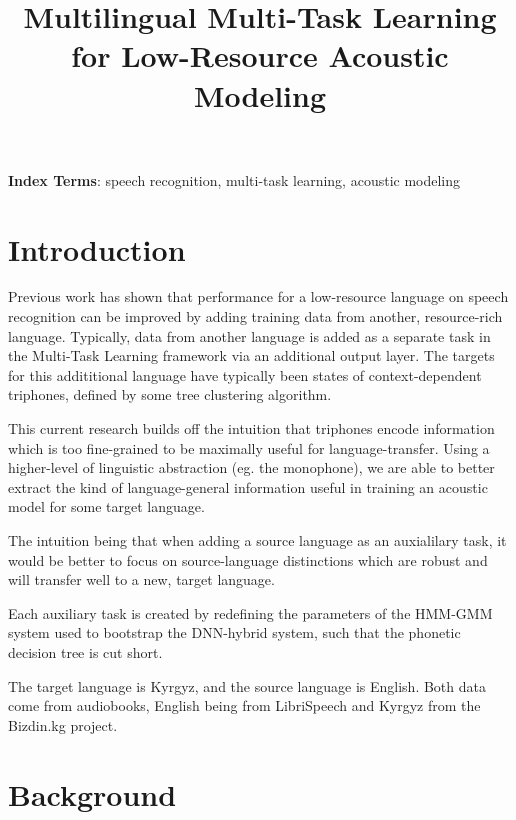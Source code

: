 \documentclass[a4paper]{article}
\title{Multilingual Multi-Task Learning for Low-Resource Acoustic Modeling}
\begin{document}
\maketitle
% 
\begin{abstract}
  
\end{abstract}
\noindent\textbf{Index Terms}: speech recognition, multi-task learning, acoustic modeling





\section{Introduction}

Previous work has shown that performance for a low-resource language on speech recognition can be improved by adding training data from another, resource-rich language. Typically, data from another language is added as a separate task in the Multi-Task Learning framework  \cite{caruana1997} via an additional output layer. The targets for this addititional language have typically been states of context-dependent triphones, defined by some tree clustering algorithm.

This current research builds off the intuition that triphones encode information which is too fine-grained to be maximally useful for language-transfer. Using a higher-level of linguistic abstraction (eg. the monophone), we are able to better extract the kind of language-general information useful in training an acoustic model for some target language.

The intuition being that when adding a source language as an auxialilary task, it would be better to focus on source-language distinctions which are robust and will transfer well to a new, target language.

Each auxiliary task is created by redefining the parameters of the HMM-GMM system used to bootstrap the DNN-hybrid system, such that the phonetic decision tree is cut short.

The target language is Kyrgyz, and the source language is English. Both data come from audiobooks, English being from LibriSpeech and Kyrgyz from the Bizdin.kg project.




\section{Background}
\end{document}
